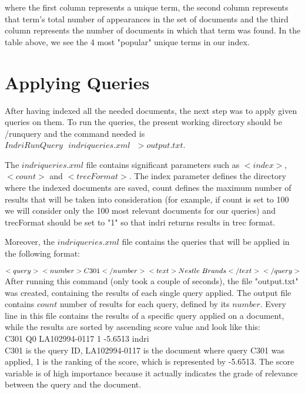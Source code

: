 \documentclass[letterpaper,11pt]{article}
\begin{document}
where the first column represents a unique term, the second column represents that term's total number of appearances in the set of documents and the third column represents the number of documents in which that term was found. In the table above, we see the 4 most "popular" unique terms in our index.

\newpage

\section{Applying Queries}

After having indexed all the needed documents, the next step was to apply given queries on them. To run the queries, the present working directory should be /runquery and the command needed is $IndriRunQuery \text{ }indriqueries.xml \text{ } >output.txt$. 

The $indriqueries.xml$ file contains significant parameters such as $<index>$, $<count>$ and $<trecFormat>$. The index parameter defines the directory where the indexed documents are saved, count defines the maximum number of results that will be taken into consideration (for example, if count is set to 100 we will consider only the 100 most relevant documents for our queries) and trecFormat should be set to "1" so that indri returns results in trec format.

Moreover, the $indriqueries.xml$ file contains the queries that will be applied in the following format: 

$<query>\\
<number>C301</number>\\
<text>Nestle \text{ }Brands</text>\\
</query>$\\

After running this command (only took a couple of seconds), the file "output.txt" was created, containing the results of each single query applied. The output file contains $count$ number of results for each query, defined by its $number$. Every line in this file contains the results of a specific query applied on a document, while the results are sorted by ascending score value and look like this: \\



C301 Q0 LA102994-0117 1 -5.6513 indri\\

C301 is the query ID, LA102994-0117 is the document where query C301 was applied, 1 is the ranking of the score, which is represented by -5.6513. The score variable is of high importance because it actually indicates the grade of relevance between the query and the document.
\end{document}

